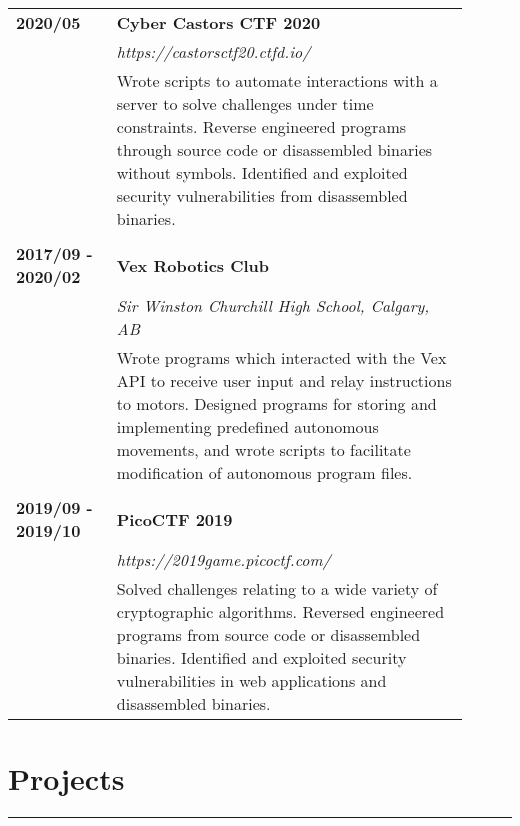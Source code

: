 \documentclass[letterpaper]{article}
\newcommand{\horizontalLine}{%
    \rule{\linewidth}{0.2pt}
    \vspace{1ex}
}
\begin{document}
        \begin{tabular}{p{0.2\linewidth} p{0.7\linewidth}} 
            \textbf{2020/05} & \large\textbf{Cyber Castors CTF 2020} \\
            & \emph{https://castorsctf20.ctfd.io/} \\
            & Wrote scripts to automate interactions with a server to solve challenges under time constraints.
            Reverse engineered programs through source code or disassembled binaries without symbols.
            Identified and exploited security vulnerabilities from disassembled binaries. \\
            \\
            \textbf{2017/09 - 2020/02} & \large\textbf{Vex Robotics Club} \\
            & \emph{Sir Winston Churchill High School, Calgary, AB} \\
            & Wrote programs which interacted with the Vex API to receive user input and relay instructions to motors.
            Designed programs for storing and implementing predefined autonomous movements, and wrote scripts to facilitate modification of autonomous program files. \\
            \\
            \textbf{2019/09 - 2019/10} & \large\textbf{PicoCTF 2019} \\
            & \emph{https://2019game.picoctf.com/} \\
            & Solved challenges relating to a wide variety of cryptographic algorithms.
            Reversed engineered programs from source code or disassembled binaries.
            Identified and exploited security vulnerabilities in web applications and disassembled binaries. \\
        \end{tabular}

    \section*{Projects}

        \horizontalLine
\end{document}
